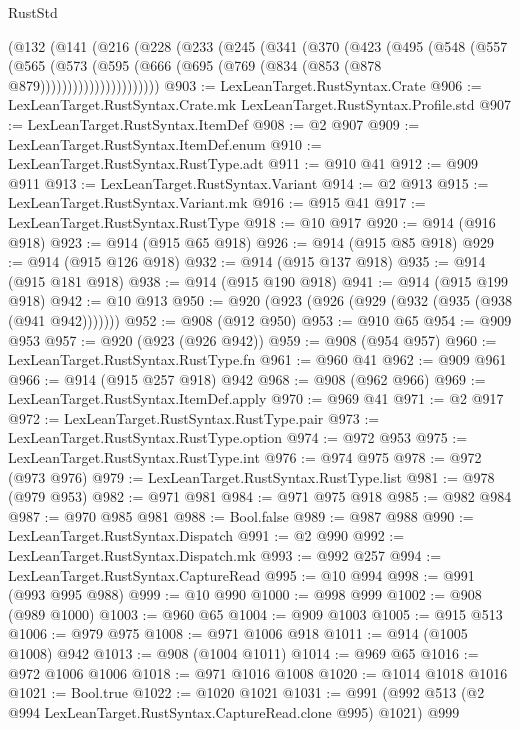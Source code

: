 \begin{lexlean}{RustStd}
\begin{coremodule}
      (@132
        (@141
          (@216
            (@228
              (@233
                (@245
                  (@341
                    (@370
                      (@423
                        (@495
                          (@548
                            (@557
                              (@565
                                (@573
                                  (@595
                                    (@666 (@695 (@769 (@834 (@853 (@878 @879))))))))))))))))))))))
@903 := LexLeanTarget.RustSyntax.Crate
@906 := LexLeanTarget.RustSyntax.Crate.mk LexLeanTarget.RustSyntax.Profile.std
@907 := LexLeanTarget.RustSyntax.ItemDef
@908 := @2 @907
@909 := LexLeanTarget.RustSyntax.ItemDef.enum
@910 := LexLeanTarget.RustSyntax.RustType.adt
@911 := @910 @41
@912 := @909 @911
@913 := LexLeanTarget.RustSyntax.Variant
@914 := @2 @913
@915 := LexLeanTarget.RustSyntax.Variant.mk
@916 := @915 @41
@917 := LexLeanTarget.RustSyntax.RustType
@918 := @10 @917
@920 := @914 (@916 @918)
@923 := @914 (@915 @65 @918)
@926 := @914 (@915 @85 @918)
@929 := @914 (@915 @126 @918)
@932 := @914 (@915 @137 @918)
@935 := @914 (@915 @181 @918)
@938 := @914 (@915 @190 @918)
@941 := @914 (@915 @199 @918)
@942 := @10 @913
@950 := @920 (@923 (@926 (@929 (@932 (@935 (@938 (@941 @942)))))))
@952 := @908 (@912 @950)
@953 := @910 @65
@954 := @909 @953
@957 := @920 (@923 (@926 @942))
@959 := @908 (@954 @957)
@960 := LexLeanTarget.RustSyntax.RustType.fn
@961 := @960 @41
@962 := @909 @961
@966 := @914 (@915 @257 @918) @942
@968 := @908 (@962 @966)
@969 := LexLeanTarget.RustSyntax.ItemDef.apply
@970 := @969 @41
@971 := @2 @917
@972 := LexLeanTarget.RustSyntax.RustType.pair
@973 := LexLeanTarget.RustSyntax.RustType.option
@974 := @972 @953
@975 := LexLeanTarget.RustSyntax.RustType.int
@976 := @974 @975
@978 := @972 (@973 @976)
@979 := LexLeanTarget.RustSyntax.RustType.list
@981 := @978 (@979 @953)
@982 := @971 @981
@984 := @971 @975 @918
@985 := @982 @984
@987 := @970 @985 @981
@988 := Bool.false
@989 := @987 @988
@990 := LexLeanTarget.RustSyntax.Dispatch
@991 := @2 @990
@992 := LexLeanTarget.RustSyntax.Dispatch.mk
@993 := @992 @257
@994 := LexLeanTarget.RustSyntax.CaptureRead
@995 := @10 @994
@998 := @991 (@993 @995 @988)
@999 := @10 @990
@1000 := @998 @999
@1002 := @908 (@989 @1000)
@1003 := @960 @65
@1004 := @909 @1003
@1005 := @915 @513
@1006 := @979 @975
@1008 := @971 @1006 @918
@1011 := @914 (@1005 @1008) @942
@1013 := @908 (@1004 @1011)
@1014 := @969 @65
@1016 := @972 @1006 @1006
@1018 := @971 @1016 @1008
@1020 := @1014 @1018 @1016
@1021 := Bool.true
@1022 := @1020 @1021
@1031 := @991 (@992 @513 (@2 @994 LexLeanTarget.RustSyntax.CaptureRead.clone @995) @1021) @999

\end{coremodule}
\end{lexlean}
